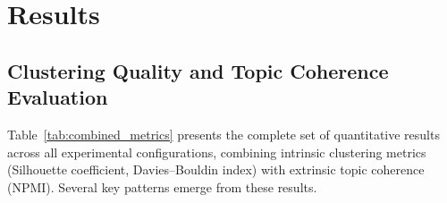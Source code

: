 \documentclass[a4paper,10pt,conference]{IEEEtran}
\begin{document}
\section{Results}

\subsection{Clustering Quality and Topic Coherence Evaluation}

Table~\ref{tab:combined_metrics} presents the complete set of quantitative results across all experimental configurations, combining intrinsic clustering metrics (Silhouette coefficient, Davies--Bouldin index) with extrinsic topic coherence (NPMI). Several key patterns emerge from these results.

\begin{table}[t]
\centering
\caption{Combined evaluation metrics across experimental configurations spanning sparse (TF-IDF), continual pretrained (BioBERT), and domain-specific from scratch (PubMedBERT) embeddings. Higher Silhouette and NPMI values indicate better performance; lower Davies--Bouldin values indicate better performance.}
\label{tab:combined_metrics}
\end{table}
\end{document}
